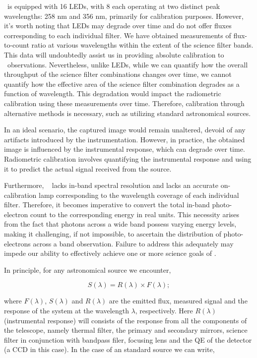 \suit~is equipped with 16 LEDs, with 8 each operating at two distinct peak wavelengths: 258 nm and 356 nm, primarily for calibration purposes. However, it's worth noting that LEDs may degrade over time and do not offer fluxes corresponding to each individual filter. We have obtained measurements of flux-to-count ratio at various wavelengths within the extent of the science filter bands. This data will undoubtedly assist us in providing absolute calibration to \suit~observations. Nevertheless, unlike LEDs, while we can quantify how the overall throughput of the science filter combinations changes over time, we cannot quantify how the effective area of the science filter combination degrades as a function of wavelength. This degradation would impact the radiometric calibration using these measurements over time. Therefore, calibration through alternative methods is necessary, such as utilizing standard astronomical sources.

In an ideal scenario, the captured image would remain unaltered, devoid of any artifacts introduced by the instrumentation. However, in practice, the obtained image is influenced by the instrumental response, which can degrade over time. Radiometric calibration involves quantifying the instrumental response and using it to predict the actual signal received from the source.

Furthermore, \suit~ lacks in-band spectral resolution and lacks an accurate on-calibration lamp corresponding to the wavelength coverage of each individual filter. Therefore, it becomes imperative to convert the total in-band photo-electron count to the corresponding energy in real units. This necessity arises from the fact that photons across a wide band possess varying energy levels, making it challenging, if not impossible, to ascertain the distribution of photo-electrons across a band observation. Failure to address this adequately may impede our ability to effectively achieve one or more science goals of \suit.

In principle, for any astronomical source we encounter,

\begin{equation*}
    S(\lambda) = R(\lambda) \times F(\lambda);
\end{equation*}

where $F(\lambda)$, $S(\lambda)$ and $R(\lambda)$ are the emitted flux, measured signal and the response of the system at the wavelength $\lambda$, respectively. Here $R(\lambda)$ (instrumental response) will consists of the response from all the components of the telescope, namely thermal filter, the primary and secondary mirrors, science filter in conjunction with bandpass filer, focusing lens and the QE of the detector (a CCD in this case). In the case of an standard source we can write,

